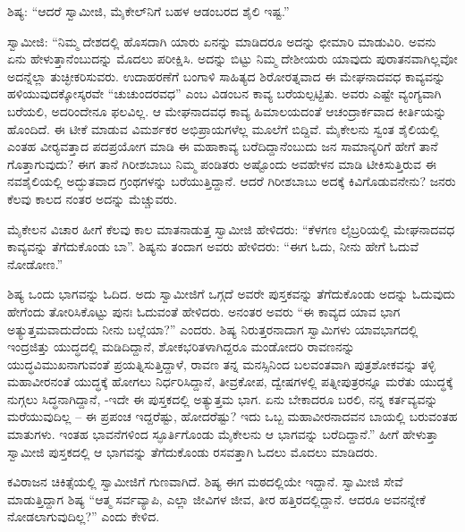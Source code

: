  ಶಿಷ್ಯ: “ಆದರೆ ಸ್ವಾಮೀಜಿ, ಮೈಕೇಲ್‌ನಿಗೆ ಬಹಳ ಆಡಂಬರದ ಶೈಲಿ ಇಷ್ಟ.” 

 ಸ್ವಾಮೀಜಿ: “ನಿಮ್ಮ ದೇಶದಲ್ಲಿ ಹೊಸದಾಗಿ ಯಾರು ಏನನ್ನು ಮಾಡಿದರೂ ಅದನ್ನು ಛೀಮಾರಿ ಮಾಡುವಿರಿ. ಅವನು ಏನು ಹೇಳುತ್ತಾನೆಂಬುದನ್ನು ಮೊದಲು ಪರೀಕ್ಷಿಸಿ. ಅದನ್ನು ಬಿಟ್ಟು ನಿಮ್ಮ ದೇಶೀಯರು ಯಾವುದು ಪುರಾತನವಾಗಿಲ್ಲವೋ ಅದನ್ನೆಲ್ಲಾ ತುಚ್ಛೀಕರಿಸುವರು. ಉದಾಹರಣೆಗೆ ಬಂಗಾಳಿ ಸಾಹಿತ್ಯದ ಶಿರೋರತ್ನವಾದ ಈ ಮೇಘನಾದವಧ ಕಾವ್ಯವನ್ನು ಹಳಿಯುವುದಕ್ಕೋಸ್ಕರವೇ “ಚುಚುಂದರವಧ” ಎಂಬ ವಿಡಂಬನ ಕಾವ್ಯ ಬರೆಯಲ್ಪಟ್ಟಿತು. ಅವರು ಎಷ್ಟೇ ವ್ಯಂಗ್ಯವಾಗಿ ಬರೆಯಲಿ, ಅದರಿಂದೇನೂ ಫಲವಿಲ್ಲ. ಆ ಮೇಘನಾದವಧ ಕಾವ್ಯ ಹಿಮಾಲಯದಂತೆ ಆಚಂದ್ರಾರ್ಕವಾದ ಕೀರ್ತಿಯನ್ನು ಹೊಂದಿದೆ. ಈ ಟೀಕೆ ಮಾಡುವ ವಿಮರ್ಶಕರ ಅಭಿಪ್ರಾಯಗಳೆಲ್ಲ ಮೂಲೆಗೆ ಬಿದ್ದಿವೆ. ಮೈಕೇಲನು ಸ್ವಂತ ಶೈಲಿಯಲ್ಲಿ ಎಂತಹ ವೀರ‍್ಯವತ್ತಾದ ಪದಪ್ರಯೋಗ ಮಾಡಿ ಈ ಮಹಾಕಾವ್ಯ ಬರೆದಿದ್ದಾನೆಂಬುದು ಜನ ಸಾಮಾನ್ಯರಿಗೆ ಹೇಗೆ ತಾನೆ ಗೊತ್ತಾಗುವುದು? ಈಗ ತಾನೆ ಗಿರೀಶಬಾಬು ನಿಮ್ಮ ಪಂಡಿತರು ಅಷ್ಟೊಂದು ಅವಹೇಳನ ಮಾಡಿ ಟೀಕಿಸುತ್ತಿರುವ ಈ ನವಶೈಲಿಯಲ್ಲಿ ಅದ್ಭುತವಾದ ಗ್ರಂಥಗಳನ್ನು ಬರೆಯುತ್ತಿದ್ದಾನೆ. ಆದರೆ ಗಿರೀಶಬಾಬು ಅದಕ್ಕೆ ಕಿವಿಗೊಡುವನೇನು? ಜನರು ಕೆಲವು ಕಾಲದ ನಂತರ ಅದನ್ನು ಮೆಚ್ಚುವರು. 

 ಮೈಕೇಲನ ವಿಚಾರ ಹೀಗೆ ಕೆಲವು ಕಾಲ ಮಾತನಾಡುತ್ತ ಸ್ವಾಮೀಜಿ ಹೇಳಿದರು: “ಕೆಳಗಣ ಲೈಬ್ರರಿಯಲ್ಲಿ ಮೇಘನಾದವಧ ಕಾವ್ಯವನ್ನು ತೆಗೆದುಕೊಂಡು ಬಾ”. ಶಿಷ್ಯನು ತಂದಾಗ ಅವರು ಹೇಳಿದರು: “ಈಗ ಓದು, ನೀನು ಹೇಗೆ ಓದುವೆ ನೋಡೋಣ.” 

 ಶಿಷ್ಯ ಒಂದು ಭಾಗವನ್ನು ಓದಿದ. ಅದು ಸ್ವಾಮೀಜಿಗೆ ಒಗ್ಗದೆ ಅವರೇ ಪುಸ್ತಕವನ್ನು ತೆಗೆದುಕೊಂಡು ಅದನ್ನು ಓದುವುದು ಹೇಗೆಂದು ತೋರಿಸಿಕೊಟ್ಟು ಪುನಃ ಓದುವಂತೆ ಹೇಳಿದರು. ಅನಂತರ ಅವರು “ಈ ಕಾವ್ಯದ ಯಾವ ಭಾಗ ಅತ್ಯುತ್ತಮವಾದುದೆಂದು ನೀನು ಬಲ್ಲೆಯಾ?” ಎಂದರು. ಶಿಷ್ಯ ನಿರುತ್ತರನಾದಾಗ ಸ್ವಾಮಿಗಳು ಯಾವಭಾಗದಲ್ಲಿ ಇಂದ್ರಜಿತ್ತು ಯುದ್ಧದಲ್ಲಿ ಮಡಿದಿದ್ದಾನೆ, ಶೋಕಭರಿತಳಾಗಿದ್ದರೂ ಮಂಡೋದರಿ ರಾವಣನನ್ನು ಯುದ್ಧವಿಮುಖನಾಗುವಂತೆ ಪ್ರಯತ್ನಿಸುತ್ತಿದ್ದಾಳೆ, ರಾವಣ ತನ್ನ ಮನಸ್ಸಿನಿಂದ ಬಲವಂತವಾಗಿ ಪುತ್ರಶೋಕವನ್ನು ತಳ್ಳಿ ಮಹಾವೀರನಂತೆ ಯುದ್ಧಕ್ಕೆ ಹೋಗಲು ನಿರ್ಧರಿಸಿದ್ದಾನೆ, ತೀವ್ರಕೋಪ, ದ್ವೇಷಗಳಲ್ಲಿ ಪತ್ನೀಪುತ್ರರನ್ನೂ ಮರೆತು ಯುದ್ಧಕ್ಕೆ ನುಗ್ಗಲು ಸಿದ್ಧನಾಗಿದ್ದಾನೆ, -ಇದೇ ಈ ಪುಸ್ತಕದಲ್ಲಿ ಅತ್ಯುತ್ತಮ ಭಾಗ. ಏನು ಬೇಕಾದರೂ ಬರಲಿ, ನನ್ನ ಕರ್ತವ್ಯವನ್ನು ಮರೆಯುವುದಿಲ್ಲ – ಈ ಪ್ರಪಂಚ ಇದ್ದರೆಷ್ಟು, ಹೋದರೆಷ್ಟು? ಇದು ಒಬ್ಬ ಮಹಾವೀರನಾದವನ ಬಾಯಲ್ಲಿ ಬರುವಂತಹ ಮಾತುಗಳು. ಇಂತಹ ಭಾವನೆಗಳಿಂದ ಸ್ಫೂರ್ತಿಗೊಂಡು ಮೈಕೇಲನು ಆ ಭಾಗವನ್ನು ಬರೆದಿದ್ದಾನೆ.” ಹೀಗೆ ಹೇಳುತ್ತಾ ಸ್ವಾಮೀಜಿ ಪುಸ್ತಕದಲ್ಲಿ ಆ ಭಾಗವನ್ನು ತೆಗೆದುಕೊಂಡು ರಸವತ್ತಾಗಿ ಓದಲು ಮೊದಲು ಮಾಡಿದರು. 

\delimiter

 ಕವಿರಾಜನ ಚಿಕಿತ್ಸೆಯಲ್ಲಿ ಸ್ವಾಮೀಜಿಗೆ ಗುಣವಾಗಿದೆ. ಶಿಷ್ಯ ಈಗ ಮಠದಲ್ಲಿಯೇ ಇದ್ದಾನೆ. ಸ್ವಾಮೀಜಿ ಸೇವೆ ಮಾಡುತ್ತಿದ್ದಾಗ ಶಿಷ್ಯ “ಆತ್ಮ ಸರ್ವವ್ಯಾಪಿ, ಎಲ್ಲಾ ಜೀವಿಗಳ ಜೀವ, ತೀರ ಹತ್ತಿರದಲ್ಲಿದ್ದಾನೆ. ಆದರೂ ಅವನನ್ನೇಕೆ ನೋಡಲಾಗುವುದಿಲ್ಲ?” ಎಂದು ಕೇಳಿದ. 

